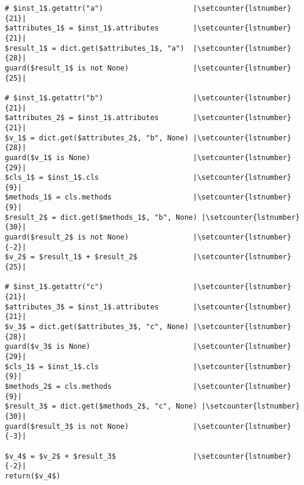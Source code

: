 {\noop
\begin{lstlisting}[mathescape,xleftmargin=20pt,numberblanklines=false,numbers=right,escapechar=|, firstnumber=27,basicstyle=\ttfamily]
# $inst_1$.getattr("a")                     |\setcounter{lstnumber}{21}|
$attributes_1$ = $inst_1$.attributes        |\setcounter{lstnumber}{21}|
$result_1$ = dict.get($attributes_1$, "a")  |\setcounter{lstnumber}{28}|
guard($result_1$ is not None)               |\setcounter{lstnumber}{25}|

# $inst_1$.getattr("b")                     |\setcounter{lstnumber}{21}|
$attributes_2$ = $inst_1$.attributes        |\setcounter{lstnumber}{21}|
$v_1$ = dict.get($attributes_2$, "b", None) |\setcounter{lstnumber}{28}|
guard($v_1$ is None)                        |\setcounter{lstnumber}{29}|
$cls_1$ = $inst_1$.cls                      |\setcounter{lstnumber}{9}|
$methods_1$ = cls.methods                   |\setcounter{lstnumber}{9}|
$result_2$ = dict.get($methods_1$, "b", None) |\setcounter{lstnumber}{30}|
guard($result_2$ is not None)               |\setcounter{lstnumber}{-2}|
$v_2$ = $result_1$ + $result_2$             |\setcounter{lstnumber}{25}|

# $inst_1$.getattr("c")                     |\setcounter{lstnumber}{21}|
$attributes_3$ = $inst_1$.attributes        |\setcounter{lstnumber}{21}|
$v_3$ = dict.get($attributes_3$, "c", None) |\setcounter{lstnumber}{28}|
guard($v_3$ is None)                        |\setcounter{lstnumber}{29}|
$cls_1$ = $inst_1$.cls                      |\setcounter{lstnumber}{9}|
$methods_2$ = cls.methods                   |\setcounter{lstnumber}{9}|
$result_3$ = dict.get($methods_2$, "c", None) |\setcounter{lstnumber}{30}|
guard($result_3$ is not None)               |\setcounter{lstnumber}{-3}|

$v_4$ = $v_2$ + $result_3$                  |\setcounter{lstnumber}{-2}|
return($v_4$)
\end{lstlisting} %
}
